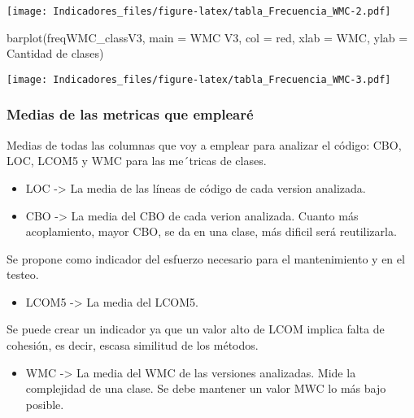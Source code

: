 \documentclass[
]{article}
\newenvironment{Shaded}{\begin{snugshade}}{\end{snugshade}}
\newcommand{\AttributeTok}[1]{\textcolor[rgb]{0.77,0.63,0.00}{#1}}
\newcommand{\FunctionTok}[1]{\textcolor[rgb]{0.00,0.00,0.00}{#1}}
\newcommand{\NormalTok}[1]{#1}
\newcommand{\StringTok}[1]{\textcolor[rgb]{0.31,0.60,0.02}{#1}}
\providecommand{\tightlist}{%
  \setlength{\itemsep}{0pt}\setlength{\parskip}{0pt}}
\begin{document}
\texttt{[image: Indicadores\_files/figure-latex/tabla\_Frecuencia\_WMC-2.pdf]}

\begin{Shaded}
\begin{Highlighting}[]
\FunctionTok{barplot}\NormalTok{(freqWMC\_classV3,}
        \AttributeTok{main =} \StringTok{\textquotesingle{}WMC V3\textquotesingle{}}\NormalTok{,}
        \AttributeTok{col =} \StringTok{\textquotesingle{}red\textquotesingle{}}\NormalTok{,}
        \AttributeTok{xlab =} \StringTok{\textquotesingle{}WMC\textquotesingle{}}\NormalTok{,}
        \AttributeTok{ylab =} \StringTok{\textquotesingle{}Cantidad de clases\textquotesingle{}}\NormalTok{)}
\end{Highlighting}
\end{Shaded}

\texttt{[image: Indicadores\_files/figure-latex/tabla\_Frecuencia\_WMC-3.pdf]}

\hypertarget{medias-de-las-metricas-que-emplearuxe9}{%
\subsubsection{Medias de las metricas que
emplearé}\label{medias-de-las-metricas-que-emplearuxe9}}

Medias de todas las columnas que voy a emplear para analizar el código:
CBO, LOC, LCOM5 y WMC para las me´tricas de clases.

\begin{itemize}
\item
  LOC -\textgreater{} La media de las líneas de código de cada version
  analizada.
\item
  CBO -\textgreater{} La media del CBO de cada verion analizada. Cuanto
  más acoplamiento, mayor CBO, se da en una clase, más dificil será
  reutilizarla.
\end{itemize}

Se propone como indicador del esfuerzo necesario para el mantenimiento y
en el testeo.

\begin{itemize}
\tightlist
\item
  LCOM5 -\textgreater{} La media del LCOM5.
\end{itemize}

Se puede crear un indicador ya que un valor alto de LCOM implica falta
de cohesión, es decir, escasa similitud de los métodos.

\begin{itemize}
\tightlist
\item
  WMC -\textgreater{} La media del WMC de las versiones analizadas. Mide
  la complejidad de una clase. Se debe mantener un valor MWC lo más bajo
  posible.
\end{itemize}
\end{document}
